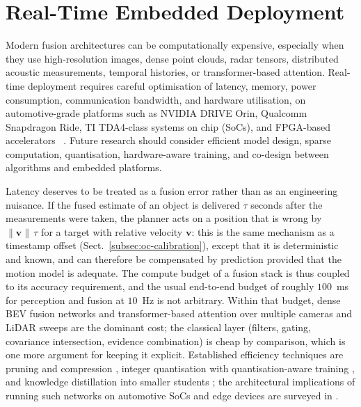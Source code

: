 \section{Real-Time Embedded Deployment}
\label{subsec:oc-embedded}

Modern fusion architectures can be computationally expensive, especially when they use high-resolution images, dense point clouds, radar tensors, distributed acoustic measurements, temporal histories, or transformer-based attention. Real-time deployment requires careful optimisation of latency, memory, power consumption, communication bandwidth, and hardware utilisation, on automotive-grade platforms such as NVIDIA DRIVE Orin, Qualcomm Snapdragon Ride, TI TDA4-class systems on chip (SoCs), and FPGA-based accelerators%
~\cite{lin2018_architectural,liu2019_edge_computing,sze2017_efficient}.
Future research should consider efficient model design, sparse computation, quantisation, hardware-aware training, and co-design between algorithms and embedded platforms.

Latency deserves to be treated as a fusion error rather than as an engineering nuisance. If the fused estimate of an object is delivered $\tau$ seconds after the measurements were taken, the planner acts on a position that is wrong by $\lVert\mathbf{v}\rVert\,\tau$ for a target with relative velocity $\mathbf{v}$: this is the same mechanism as a timestamp offset (Sect.~\ref{subsec:oc-calibration}), except that it is deterministic and known, and can therefore be compensated by prediction provided that the motion model is adequate. The compute budget of a fusion stack is thus coupled to its accuracy requirement, and the usual end-to-end budget of roughly $100$~ms for perception and fusion at $10$~Hz is not arbitrary. Within that budget, dense BEV fusion networks and transformer-based attention over multiple cameras and LiDAR sweeps are the dominant cost; the classical layer (filters, gating, covariance intersection, evidence combination) is cheap by comparison, which is one more argument for keeping it explicit. Established efficiency techniques are pruning and compression \cite{han2016_deep_compression}, integer quantisation with quantisation-aware training \cite{jacob2018_quantization}, and knowledge distillation into smaller students \cite{hinton2015_distillation}; the architectural implications of running such networks on automotive SoCs and edge devices are surveyed in \cite{lin2018_architectural,liu2019_edge_computing,sze2017_efficient}.

